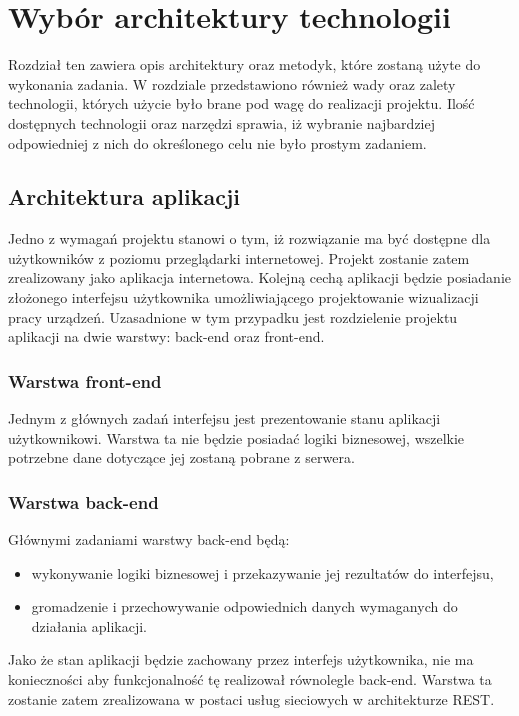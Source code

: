 \chapter{Wybór architektury technologii}

Rozdział ten zawiera opis architektury oraz metodyk, które zostaną użyte do wykonania zadania. W rozdziale przedstawiono również wady oraz zalety technologii, których użycie było brane pod wagę do realizacji projektu. Ilość dostępnych technologii oraz narzędzi sprawia, iż wybranie najbardziej odpowiedniej z nich do określonego celu nie było prostym zadaniem.

\section{Architektura aplikacji}
Jedno z wymagań projektu stanowi o tym, iż rozwiązanie ma być dostępne dla użytkowników z poziomu przeglądarki internetowej. Projekt zostanie zatem zrealizowany jako aplikacja internetowa. Kolejną cechą aplikacji będzie posiadanie złożonego interfejsu użytkownika umożliwiającego projektowanie wizualizacji pracy urządzeń. Uzasadnione w tym przypadku jest rozdzielenie projektu aplikacji na dwie warstwy: back-end oraz front-end.

\subsection{Warstwa front-end}
Jednym z głównych zadań interfejsu jest prezentowanie stanu aplikacji użytkownikowi. Warstwa ta nie będzie posiadać logiki biznesowej, wszelkie potrzebne dane dotyczące jej zostaną pobrane z serwera.

\subsection{Warstwa back-end}
Głównymi zadaniami warstwy back-end będą:
\begin{itemize}
\item wykonywanie logiki biznesowej i przekazywanie jej rezultatów do interfejsu,
\item gromadzenie i przechowywanie odpowiednich danych wymaganych do działania aplikacji.
\end{itemize}

Jako że stan aplikacji będzie zachowany przez interfejs użytkownika, nie ma konieczności aby funkcjonalność tę realizował równolegle back-end. Warstwa ta zostanie zatem zrealizowana w postaci usług sieciowych w architekturze REST.

